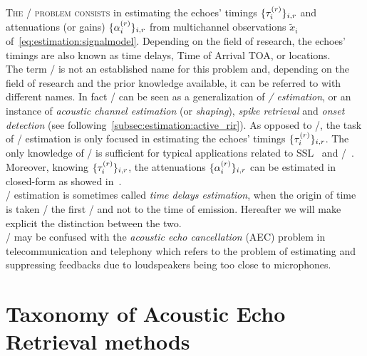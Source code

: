 \mynewline
\textsc{The \AERdef/ problem consists} in estimating the echoes' timings $\{\tau_{i}^{(r)}\}_{i,r}$ and attenuations (or gains) $\{\alpha_{i}^{(r)}\}_{i,r}$ from multichannel observations $\tilde{x}_i$ of~\cref{eq:estimation:signalmodel}.
Depending on the field of research, the echoes' timings are also known as time delays, Time of Arrival \acs{TOA}, or locations.
\\The term \AER/ is not an established name for this problem and, depending on the field of research and the prior knowledge available, it can be referred to with different names.
In fact \AER/ can be seen as a generalization of \textit{\TOAs/ estimation}, or an instance of \textit{acoustic channel estimation} (or \textit{shaping}), \textit{spike retrieval} and \textit{onset detection} (see following~\cref{subsec:estimation:active_rir}).
As opposed to \AER/, the task of \TOAs/ estimation is only focused in estimating the echoes' timings $\{\tau_{i}^{(r)}\}_{i,r}$.
The only knowledge of \TOAs/ is sufficient for typical applications related to \acf{SSL}~ and \RooGE/~.
\\Moreover, knowing $\{\tau_{i}^{(r)}\}_{i,r}$, the attenuations $\{\alpha_{i}^{(r)}\}_{i,r}$ can be estimated in closed-form as showed in~.
\\\TOAs/ estimation is sometimes called \textit{time delays estimation}, when the origin of time is taken \wrt/ the first \TOA/ and not to the time of emission.
Hereafter we will make explicit the distinction between the two.
\\\AER/ may be confused with the \textit{acoustic echo cancellation} (AEC) problem in telecommunication and telephony which refers to the problem of estimating and suppressing feedbacks due to loudspeakers being too close to microphones.

\section{Taxonomy of Acoustic Echo Retrieval methods}\label{sec:estimation:taxonomy}


